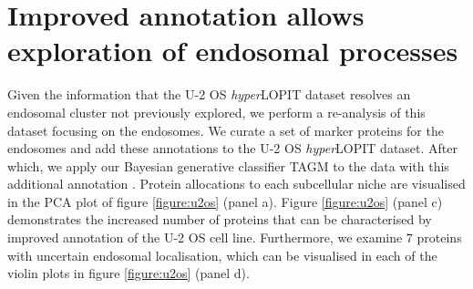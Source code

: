 \documentclass[12pt,english]{article}
\begin{document}
\section{Improved annotation allows exploration of endosomal processes}
Given the information that the U-2 OS \textit{hyper}LOPIT dataset resolves an endosomal cluster not previously explored, we perform a re-analysis of this dataset focusing on the endosomes. We curate a set of marker proteins for the endosomes and add these annotations to the U-2 OS \textit{hyper}LOPIT dataset. After which, we apply our Bayesian generative classifier TAGM to the data with this additional annotation \citep{Crook:2018}. Protein allocations to each subcellular niche are visualised in the PCA plot of figure \ref{figure:u2os} (panel a). Figure \ref{figure:u2os} (panel c) demonstrates the increased number of proteins that can be characterised by improved annotation of the U-2 OS cell line. Furthermore, we examine $7$ proteins with uncertain endosomal localisation, which can be visualised in each of the violin plots in figure \ref{figure:u2os} (panel d).
\end{document}
